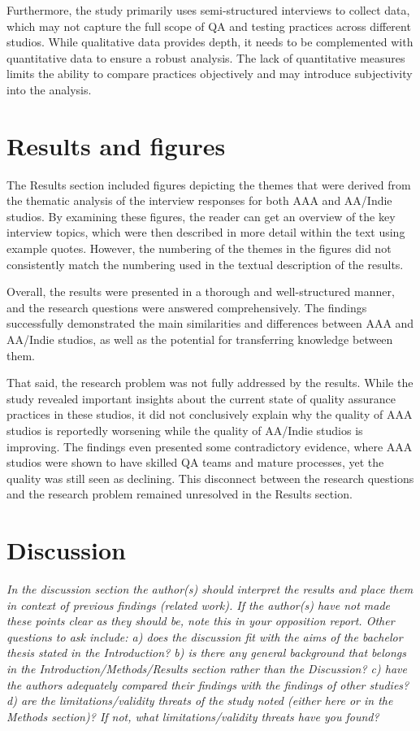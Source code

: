 \documentclass[conference]{IEEEtran}
\begin{document}
Furthermore, the study primarily uses semi-structured interviews to collect data, which may not capture the full scope of QA and testing practices across different studios. While qualitative data provides depth, it needs to be complemented with quantitative data to ensure a robust analysis. The lack of quantitative measures limits the ability to compare practices objectively and may introduce subjectivity into the analysis.

\section{Results and figures}
The Results section included figures depicting the themes that were derived from the thematic analysis of the interview responses for both AAA and AA/Indie studios. By examining these figures, the reader can get an overview of the key interview topics, which were then described in more detail within the text using example quotes. However, the numbering of the themes in the figures did not consistently match the numbering used in the textual description of the results.

Overall, the results were presented in a thorough and well-structured manner, and the research questions were answered comprehensively. The findings successfully demonstrated the main similarities and differences between AAA and AA/Indie studios, as well as the potential for transferring knowledge between them.

That said, the research problem was not fully addressed by the results. While the study revealed important insights about the current state of quality assurance practices in these studios, it did not conclusively explain why the quality of AAA studios is reportedly worsening while the quality of AA/Indie studios is improving. The findings even presented some contradictory evidence, where AAA studios were shown to have skilled QA teams and mature processes, yet the quality was still seen as declining. This disconnect between the research questions and the research problem remained unresolved in the Results section.


\section{Discussion}
\textit{In the discussion section the author(s) should interpret the results and place them in context of previous findings (related work). If the author(s) have not made these points clear as they should be, note this in your opposition report. Other questions to ask include: a) does the discussion fit with the aims of the bachelor thesis stated in the Introduction? b) is there any general background that belongs in the Introduction/Methods/Results section rather than the Discussion? c) have the authors adequately compared their findings with the findings of other studies? d) are the limitations/validity threats of the study noted (either here or in the Methods section)? If not, what limitations/validity threats have you found?}
\end{document}
